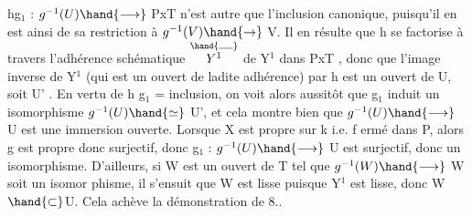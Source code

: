 

hg$_1$ :  $g^{-1}(U) \hand{\longrightarrow}$ PxT  n'est autre que l'inclusion canonique, puisqu'il
en est ainsi de sa restriction à $g^{-1}(V) \hand{\rightarrow}$ V.  
 Il en résulte que h  se factorise
à travers l'adhérence schématique  $\overset{\hand{\rule{1.1em}{0.35pt}}}{Y^1}$ de Y$^1$ dans  PxT , donc que
l'image inverse de Y$^1$ (qui est un ouvert de ladite adhérence) par h
est un ouvert de U, soit U' . En vertu de  h g$_1$ = inclusion, on
voit alors aussitôt que  g$_1$ induit un isomorphisme  $g^{-1}(U) \hand{\simeq}$ U', et
 cela montre bien que  $g^{-1}(U) \hand{\longrightarrow}$ U est une immersion ouverte.
Lorsque X est propre sur k i.e. f ermé dans P, alors  g est propre donc
surjectif, donc  g$_1$ : $g^{-1}(U) \hand{\longrightarrow}$ U est surjectif, donc un isomorphisme.
D'ailleurs, si  W est un ouvert de T tel que  $g^{-1}(W) \hand{\longrightarrow}$ W soit un isomor%
phisme, il s'ensuit que W est lisse puisque Y$^1$ est lisse, donc W$\hand{\subset}$U.
Cela achève la démonstration de 8.. 

